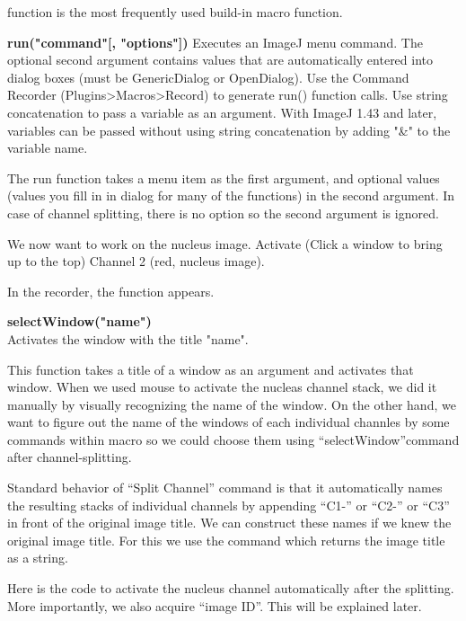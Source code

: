 function is the most frequently used build-in macro function.

\begin{indentCom}
  \textbf{run("command"[, "options"])} 
  Executes an ImageJ menu command. The optional second argument contains values that are automatically entered into dialog boxes (must be GenericDialog or OpenDialog). Use the Command Recorder (Plugins>Macros>Record) to generate run() function calls. Use string concatenation to pass a variable as an argument. With ImageJ 1.43 and later, variables can be passed without using string concatenation by adding "\&" to the variable name.
\end{indentCom}

The run function takes a menu item as the first argument, and optional values (values you fill in in dialog for many of the functions) in the second argument. In case of channel splitting, there is no option so the second argument is ignored.

We now want to work on the nucleus image. Activate (Click a window to bring up to the top) Channel 2 (red, nucleus image).

In the recorder, the function  appears.

\begin{indentCom}
  \textbf{selectWindow("name")} \\
Activates the window with the title "name".
\end{indentCom}

This function takes a title of a window as an argument and activates that window. When we used mouse to activate the nucleas channel stack, we did it manually by visually recognizing the name of the window. On the other hand, we want to figure out the name of the windows of each individual channles by some commands within macro so we could choose them using ``selectWindow''command after channel-splitting.

Standard behavior of ``Split Channel'' command is that it automatically names the resulting stacks of individual channels by appending ``C1-'' or ``C2-'' or ``C3'' in front of the original image title. We can construct these names if we knew the original image title. For this we use the command  which returns the image title as a string.



Here is the code to activate the nucleus channel automatically after the splitting. More importantly, we also acquire ``image ID''. This will be explained later.